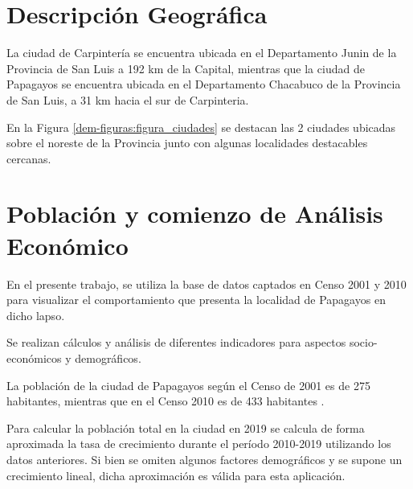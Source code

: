 \section{Descripción Geográfica}

La ciudad de  Carpintería se encuentra ubicada en el Departamento Junin de la Provincia de San Luis a 192 km de la Capital, mientras que la ciudad de Papagayos se encuentra ubicada en el Departamento Chacabuco de la Provincia de San Luis, a 31 km hacia el sur de Carpinteria.

En la Figura \ref{dem-figuras:figura_ciudades} se destacan las 2 ciudades ubicadas sobre el noreste de la Provincia junto con algunas localidades destacables cercanas.


\section{Población y comienzo de Análisis Económico}



En el presente trabajo, se utiliza la base de datos captados en Censo 2001 y 2010 para visualizar el comportamiento que presenta la localidad de Papagayos en dicho lapso.

Se realizan cálculos y análisis de diferentes indicadores para aspectos socio-económicos y demográficos.


La población de la ciudad de Papagayos según el Censo de 2001 es de 275 habitantes, mientras que en el Censo 2010 es de 433 habitantes \cite{censo2010}.



Para calcular la población total en la ciudad en 2019 se calcula de forma aproximada la tasa de crecimiento durante el período 2010-2019 utilizando los datos anteriores. Si bien se omiten algunos factores demográficos y se supone un crecimiento lineal, dicha aproximación es válida para esta aplicación.



